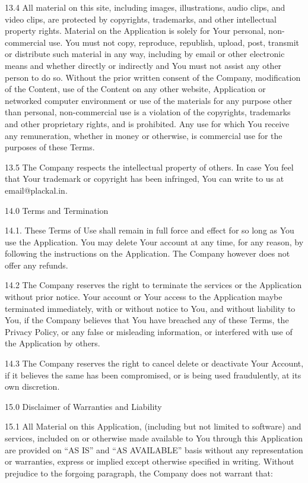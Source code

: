13.4      All material on this site, including images, illustrations, audio clips, and video clips, are protected by copyrights, trademarks, and other intellectual property rights. Material on the Application is solely for Your personal, non-commercial use. You must not copy, reproduce, republish, upload, post, transmit or distribute such material in any way, including by email or other electronic means and whether directly or indirectly and You must not assist any other person to do so. Without the prior written consent of the Company, modification of the Content, use of the Content on any other website, Application or networked computer environment or use of the materials for any purpose other than personal, non-commercial use is a violation of the copyrights, trademarks and other proprietary rights, and is prohibited. Any use for which You receive any remuneration, whether in money or otherwise, is commercial use for the purposes of these Terms.

13.5      The Company respects the intellectual property of others. In case You feel that Your trademark or copyright has been infringed, You can write to us at email@plackal.in.

 

14.0     Terms and Termination

14.1.      These Terms of Use shall remain in full force and effect for so long as You use the Application. You may delete Your account at any time, for any reason, by following the instructions on the Application. The Company however does not offer any refunds.

14.2       The Company reserves the right to terminate the services or the Application without prior notice. Your account or Your access to the Application maybe terminated immediately, with or without notice to You, and without liability to You, if the Company believes that You have breached any of these Terms, the Privacy Policy, or any false or misleading information, or interfered with use of the Application by others.

14.3       The Company reserves the right to cancel delete or deactivate Your Account, if it believes the same has been compromised, or is being used fraudulently, at its own discretion.

 

15.0       Disclaimer of Warranties and Liability

15.1       All Material on this Application, (including but not limited to software) and services, included on or otherwise made available to You through this Application are provided on “AS IS” and “AS AVAILABLE” basis without any representation or warranties, express or implied except otherwise specified in writing. Without prejudice to the forgoing paragraph, the Company does not warrant that:

